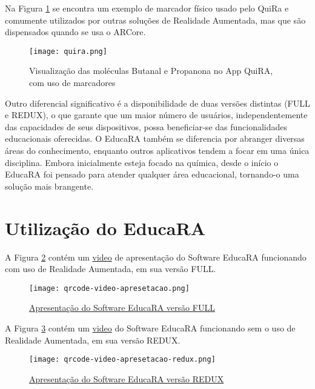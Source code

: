 \documentclass[12pt]{article}
\begin{document}
Na Figura \ref{fig:quira} se encontra um exemplo de marcador físico usado pelo QuiRa \cite{soares2018quira} e comumente utilizados por outras soluções de Realidade Aumentada, mas que são dispensados
quando se usa o ARCore.

\begin{figure}[H]
  \centering
  \texttt{[image: quira.png]}
  \caption{Visualização das moléculas Butanal e Propanona no App QuiRA, com uso de marcadores}
  \label{fig:quira}
\end{figure}

Outro diferencial significativo é a disponibilidade de duas versões distintas (FULL e REDUX), o que garante que um maior número de usuários, independentemente das capacidades de seus dispositivos, possa beneficiar-se das funcionalidades educacionais oferecidas. O EducaRA também se diferencia por abranger diversas áreas do conhecimento, enquanto outros aplicativos tendem a focar em uma única disciplina. Embora inicialmente esteja focado na química, desde o início o EducaRA foi pensado para atender qualquer área educacional, tornando-o uma solução mais brangente.


\section{Utilização do EducaRA}

A Figura \ref{fig:qrcode-full} contém um \href{https://www.youtube.com/watch?v=WBM7_cAoGCM}{video}  de apresentação do Software EducaRA funcionando com uso de Realidade Aumentada, em sua versão FULL.

\begin{figure}[H]
  \centering
  \texttt{[image: qrcode-video-apresetacao.png]}
  \caption{\href{https://www.youtube.com/watch?v=WBM7_cAoGCM}{Apresentação do Software EducaRA versão FULL}}
  \label{fig:qrcode-full}
\end{figure}

A Figura \ref{fig:qrcode-redux} contém um \href{https://youtube.com/shorts/jFEH1u57GtI}{video} do Software EducaRA funcionando sem o uso de Realidade Aumentada, em sua versão REDUX.

\begin{figure}[!htb]
  \centering
  \texttt{[image: qrcode-video-apresetacao-redux.png]}
  \caption{\href{https://youtube.com/shorts/jFEH1u57GtI}{Apresentação do Software EducaRA versão REDUX}}
  \label{fig:qrcode-redux}
\end{figure}
\end{document}

